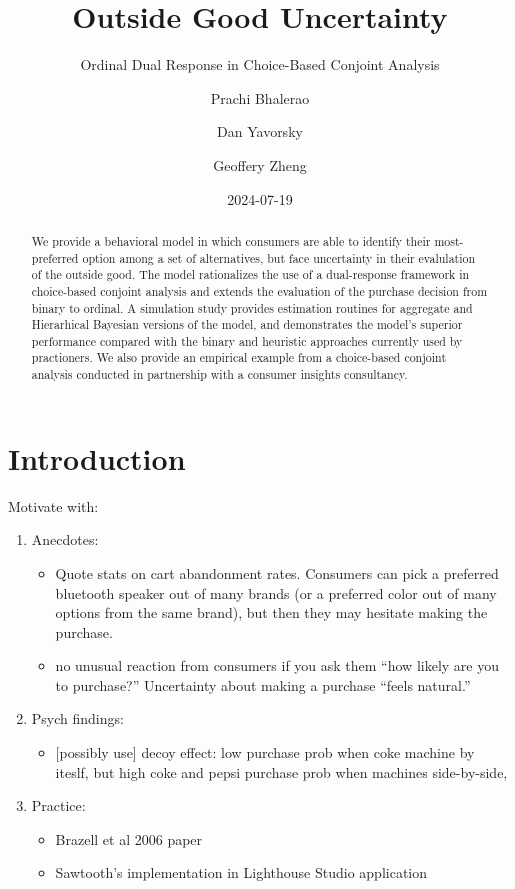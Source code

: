 \documentclass[
  letterpaper,
  DIV=11,
  numbers=noendperiod]{scrartcl}
\title{Outside Good Uncertainty}
\subtitle{Ordinal Dual Response in Choice-Based Conjoint Analysis}
\author{Prachi Bhalerao \and Dan Yavorsky \and Geoffery Zheng}
\date{2024-07-19}
\providecommand{\tightlist}{%
  \setlength{\itemsep}{0pt}\setlength{\parskip}{0pt}}\usepackage{longtable,booktabs,array}
\begin{document}
\maketitle
\begin{abstract}
We provide a behavioral model in which consumers are able to identify
their most-preferred option among a set of alternatives, but face
uncertainty in their evalulation of the outside good. The model
rationalizes the use of a dual-response framework in choice-based
conjoint analysis and extends the evaluation of the purchase decision
from binary to ordinal. A simulation study provides estimation routines
for aggregate and Hierarhical Bayesian versions of the model, and
demonstrates the model's superior performance compared with the binary
and heuristic approaches currently used by practioners. We also provide
an empirical example from a choice-based conjoint analysis conducted in
partnership with a consumer insights consultancy.
\end{abstract}


  \newcommand{\x}{\mathbf{x}}
  \newcommand{\bfbeta}{\boldsymbol{\beta}}
  \newcommand{\iid}{\stackrel{iid}{\sim}}

\section{Introduction}\label{sec-intro}

Motivate with:

\begin{enumerate}
\def\labelenumi{\arabic{enumi}.}
\item
  Anecdotes:

  \begin{itemize}
  \tightlist
  \item
    Quote stats on cart abandonment rates. Consumers can pick a
    preferred bluetooth speaker out of many brands (or a preferred color
    out of many options from the same brand), but then they may hesitate
    making the purchase.
  \item
    no unusual reaction from consumers if you ask them ``how likely are
    you to purchase?'' Uncertainty about making a purchase ``feels
    natural.''
  \end{itemize}
\item
  Psych findings:

  \begin{itemize}
  \tightlist
  \item
    {[}possibly use{]} decoy effect: low purchase prob when coke machine
    by iteslf, but high coke and pepsi purchase prob when machines
    side-by-side,
  \end{itemize}
\item
  Practice:

  \begin{itemize}
  \tightlist
  \item
    Brazell et al 2006 paper
  \item
    Sawtooth's implementation in Lighthouse Studio application
  \end{itemize}
\end{enumerate}
\end{document}
